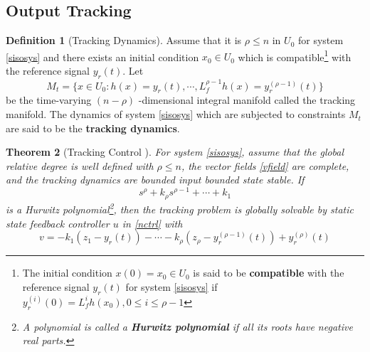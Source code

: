 \documentclass[11pt, a4paper, oneside, openany, reqno]{book}
\newtheorem{theorem}{Theorem}[chapter]
\theoremstyle{definition}
\newtheorem{definition}[theorem]{Definition}
\theoremstyle{remark}
\numberwithin{equation}{chapter} %
\begin{document}
\subsection{Output Tracking}

\begin{definition}[Tracking Dynamics]
	Assume that it is $ \rho \leq n $ in $ U_0 $ for system \eqref{sisosys} 
	and there exists an initial condition $ x_0 \in U_0$ 
	which is compatible\footnote{The initial condition $ x(0)=x_0 \in U_0 $ 
	is said to be \textbf{compatible} 
	with the reference signal $ y_r (t) $ for system \eqref{sisosys} 
	if $ y_r^{(i)} (0) = L_f^i h(x_0), 0 \leq i \leq \rho -1 $} 
	with the reference signal $ y_r(t) $. Let \\
	\begin{equation}
	M_t = \lbrace x \in U_0 : h(x) = y_r(t),\cdots , L_f^{\rho-1} h(x) = y_r^{(\rho-1)}(t) \rbrace
	\end{equation}
	be the time-varying $ (n-\rho) $ -dimensional integral manifold called the tracking manifold. 
	The dynamics of system \eqref{sisosys} which are subjected to constraints $ M_t $ are said to be
	the \textbf{tracking dynamics}.
\end{definition}

\begin{theorem}[Tracking Control \cite{marino}]
	For system \eqref{sisosys}, 
	assume that the global relative degree is well defined with $ \rho \leq n $,
	the vector fields \eqref{vfield} are complete, 
	and the tracking dynamics are bounded input bounded state stable. If 
	\begin{equation}\label{sisohurwiz}
	s^\rho + k_\rho s^{\rho-1} + \cdots + k_1
	\end{equation}
	is a Hurwitz polynomial\footnote{A polynomial is called a \textbf{Hurwitz polynomial} 
	if all its roots have negative real parts.}, 
	then the tracking problem is globally solvable 
	by static state feedback controller $ u $ in \eqref{nctrl} with 
	\begin{equation}\label{sisov}
	v= -k_1(z_1 - y_r (t)) - \cdots - k_\rho (z_\rho - y_r^{(\rho -1)}(t)) + y_r^{(\rho)} (t)
	\end{equation}
\end{theorem}
\end{document}
